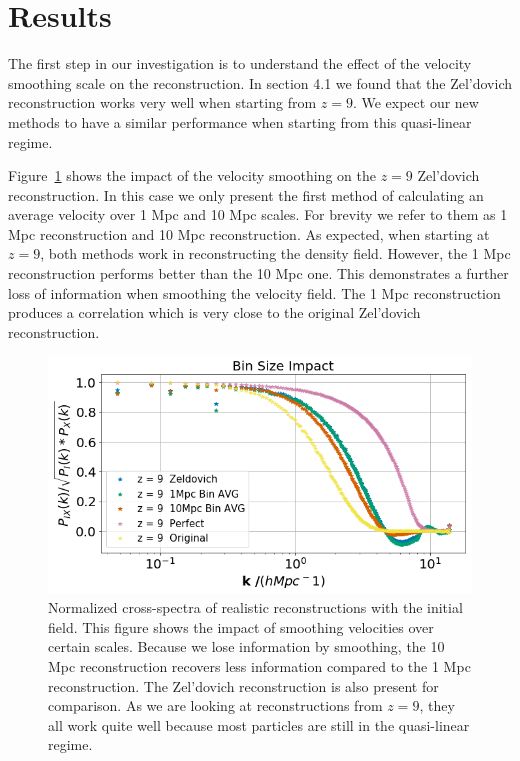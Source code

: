 \section{Results}

The first step in our investigation is to understand the effect of the velocity smoothing scale on the reconstruction. In section 4.1 we found that the Zel'dovich reconstruction works very well when starting from $z=9$. We expect our new methods to have a similar performance when starting from this quasi-linear regime. 

Figure~\ref{fig:4.2} shows the impact of the velocity smoothing on the $z=9$ Zel'dovich reconstruction. In this case we only present the first method of calculating an average velocity over 1 Mpc and 10 Mpc scales. For brevity we refer to them as 1 Mpc reconstruction and 10 Mpc reconstruction. As expected, when starting at $z=9$, both methods work in reconstructing the density field. However, the 1 Mpc reconstruction performs better than the 10 Mpc one. This demonstrates a further loss of information when smoothing the velocity field. The 1 Mpc reconstruction produces a correlation which is very close to the original Zel'dovich reconstruction.

\begin{figure}
    \centering
    \includegraphics[width=1\columnwidth]{images/realRecon/binSize.png}%
    
    \caption{
    Normalized cross-spectra of realistic reconstructions with the initial field. This figure shows the impact of smoothing velocities over certain scales. Because we lose information by smoothing, the 10 Mpc reconstruction recovers less information compared to the 1 Mpc reconstruction. The Zel'dovich reconstruction is also present for comparison. As we are looking at reconstructions from $z=9$, they all work quite well because most particles are still in the quasi-linear regime.
    }
    
    \label{fig:4.2}
\end{figure}


